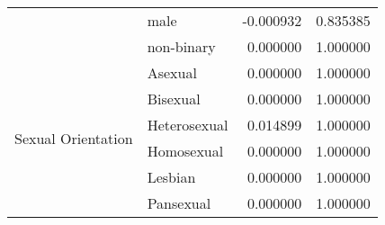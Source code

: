 \begin{longtable}{llrr}
 & male & -0.000932 & 0.835385 \\
 & non-binary & 0.000000 & 1.000000 \\
\cline{1-4}
\multirow[t]{6}{*}{Sexual Orientation} & Asexual & 0.000000 & 1.000000 \\
 & Bisexual & 0.000000 & 1.000000 \\
 & Heterosexual & 0.014899 & 1.000000 \\
 & Homosexual & 0.000000 & 1.000000 \\
 & Lesbian & 0.000000 & 1.000000 \\
 & Pansexual & 0.000000 & 1.000000 \\
\cline{1-4}
\end{longtable}
